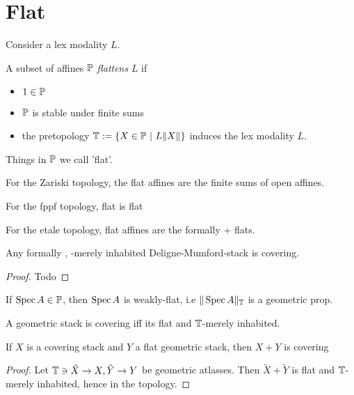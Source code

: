 \section{Flat}
Consider a lex modality $L$.
\begin{definition}
	A subset of affines $\mathbb{P}$ \emph{flattens} $L$ if
	\begin{itemize}
		\item $1 \in \mathbb{P}$
		\item $\mathbb{P}$ is stable under finite sums
		\item 	 the pretopology $\bT := \{ X \in \bP \ | \ L \| X \| \}$ induces the lex modality $L$.
	\end{itemize}
	
\end{definition}

Things in $\mathbb{P}$ we call 'flat'.
\begin{example}
	For the Zariski topology, the flat affines are the finite sums of open affines.
\end{example}
\begin{example}
	For the fppf topology, flat is flat
\end{example}
\begin{example}
	For the etale topology, flat affines are the formally \etale + flats.
\end{example}
\begin{lemma}{\label{lemma:coveringDMstacks}}
	Any formally \etale, \etale-merely inhabited Deligne-Mumford-stack is covering.
\end{lemma}
\begin{proof}
	Todo
\end{proof}
\begin{lemma}
	If $\operatorname{Spec} A \in \mathbb{P}$, then $\operatorname{Spec} A$ is weakly-flat, i.e $\| \operatorname{Spec} A\|_{\mathbb{T}}$ is a geometric prop.
\end{lemma}
\begin{lemma}{\label{lemma:detectCovering}}
	A geometric stack is covering iff its flat and $\mathbb{T}$-merely inhabited.
\end{lemma}

\begin{lemma}
	If $X$ is a covering stack and $Y$ a flat geometric stack, then $X + Y$ is covering
\end{lemma}
\begin{proof}
	Let $\mathbb{T} \ni \tilde X \to X, \tilde Y \to Y$ be geometric atlasses. Then $\tilde X+ \tilde Y$ is flat and $\mathbb{T}$-merely inhabited, hence in the topology.
\end{proof}


